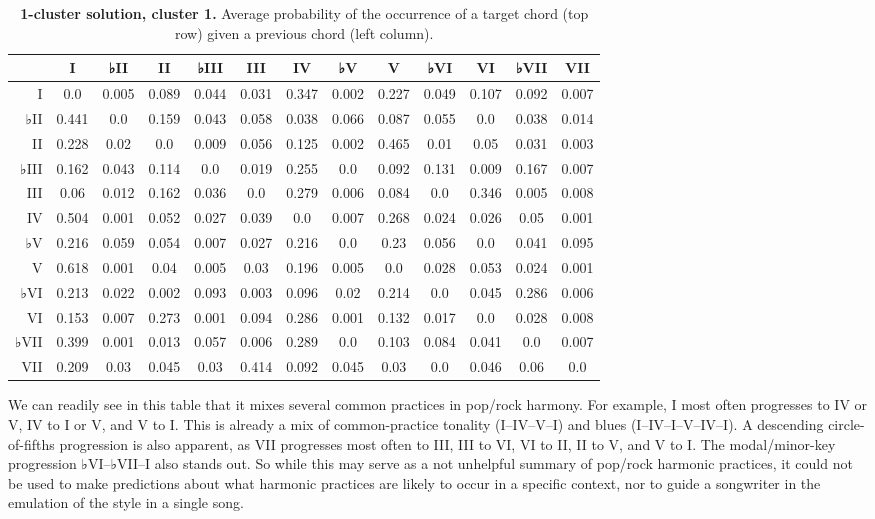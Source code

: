 \begin{table}[htbp]
\begin{minipage}{\linewidth}
\setlength{\tymax}{0.5\linewidth}
\centering
\small
\caption{\textbf{1-cluster solution, cluster 1.} Average probability of the occurrence of a target chord (top row) given a previous chord (left column).}
\label{1-clustersolutioncluster1.averageprobabilityoftheoccurrenceofatargetchordtoprowgivenapreviouschordleftcolumn.}
\begin{tabulary}{\textwidth}{@{}RCCCCCCCCCCCC@{}} \toprule
&I&♭II&II&♭III&III&IV&♭V&V&♭VI&VI&♭VII&VII\\
\midrule
I&0.0&0.005&0.089&0.044&0.031&0.347&0.002&0.227&0.049&0.107&0.092&0.007\\
♭II&0.441&0.0&0.159&0.043&0.058&0.038&0.066&0.087&0.055&0.0&0.038&0.014\\
II&0.228&0.02&0.0&0.009&0.056&0.125&0.002&0.465&0.01&0.05&0.031&0.003\\
♭III&0.162&0.043&0.114&0.0&0.019&0.255&0.0&0.092&0.131&0.009&0.167&0.007\\
III&0.06&0.012&0.162&0.036&0.0&0.279&0.006&0.084&0.0&0.346&0.005&0.008\\
IV&0.504&0.001&0.052&0.027&0.039&0.0&0.007&0.268&0.024&0.026&0.05&0.001\\
♭V&0.216&0.059&0.054&0.007&0.027&0.216&0.0&0.23&0.056&0.0&0.041&0.095\\
V&0.618&0.001&0.04&0.005&0.03&0.196&0.005&0.0&0.028&0.053&0.024&0.001\\
♭VI&0.213&0.022&0.002&0.093&0.003&0.096&0.02&0.214&0.0&0.045&0.286&0.006\\
VI&0.153&0.007&0.273&0.001&0.094&0.286&0.001&0.132&0.017&0.0&0.028&0.008\\
♭VII&0.399&0.001&0.013&0.057&0.006&0.289&0.0&0.103&0.084&0.041&0.0&0.007\\
VII&0.209&0.03&0.045&0.03&0.414&0.092&0.045&0.03&0.0&0.046&0.06&0.0\\

\bottomrule

\end{tabulary}
\end{minipage}
\end{table}

We can readily see in this table that it mixes several common practices in pop\slash rock harmony. For example, I most often progresses to IV or V, IV to I or V, and V to I. This is already a mix of common-practice tonality (I–IV–V–I) and blues (I–IV–I–V–IV–I). A descending circle-of-fifths progression is also apparent, as VII progresses most often to III, III to VI, VI to II, II to V, and V to I. The modal\slash minor-key progression ♭VI–♭VII–I also stands out. So while this may serve as a not unhelpful summary of pop\slash rock harmonic practices, it could not be used to make predictions about what harmonic practices are likely to occur in a specific context, nor to guide a songwriter in the emulation of the style in a single song.

